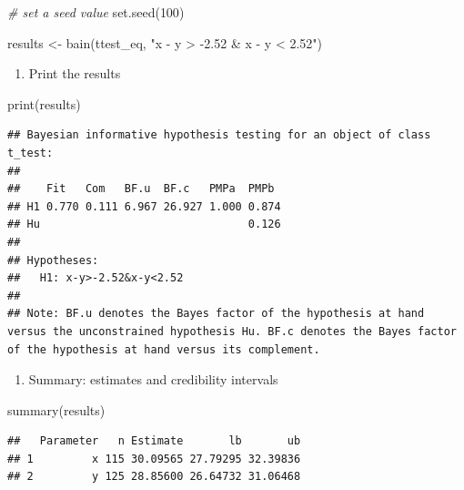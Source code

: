 \documentclass[
]{book}
\newenvironment{Shaded}{\begin{snugshade}}{\end{snugshade}}
\newcommand{\CommentTok}[1]{\textcolor[rgb]{0.56,0.35,0.01}{\textit{#1}}}
\newcommand{\DecValTok}[1]{\textcolor[rgb]{0.00,0.00,0.81}{#1}}
\newcommand{\FunctionTok}[1]{\textcolor[rgb]{0.00,0.00,0.00}{#1}}
\newcommand{\NormalTok}[1]{#1}
\newcommand{\OtherTok}[1]{\textcolor[rgb]{0.56,0.35,0.01}{#1}}
\newcommand{\StringTok}[1]{\textcolor[rgb]{0.31,0.60,0.02}{#1}}
\providecommand{\tightlist}{%
  \setlength{\itemsep}{0pt}\setlength{\parskip}{0pt}}
\begin{document}
\begin{Shaded}
\begin{Highlighting}[]
\CommentTok{\# set a seed value}
\FunctionTok{set.seed}\NormalTok{(}\DecValTok{100}\NormalTok{)}

\NormalTok{results }\OtherTok{\textless{}{-}} \FunctionTok{bain}\NormalTok{(ttest\_eq, }\StringTok{"x {-} y \textgreater{} {-}2.52 \& x {-} y \textless{} 2.52"}\NormalTok{)}
\end{Highlighting}
\end{Shaded}

\begin{enumerate}
\def\labelenumi{\arabic{enumi})}
\setcounter{enumi}{2}
\tightlist
\item
  Print the results
\end{enumerate}

\begin{Shaded}
\begin{Highlighting}[]
\FunctionTok{print}\NormalTok{(results)}
\end{Highlighting}
\end{Shaded}

\begin{verbatim}
## Bayesian informative hypothesis testing for an object of class t_test:
## 
##    Fit   Com   BF.u  BF.c   PMPa  PMPb 
## H1 0.770 0.111 6.967 26.927 1.000 0.874
## Hu                                0.126
## 
## Hypotheses:
##   H1: x-y>-2.52&x-y<2.52
## 
## Note: BF.u denotes the Bayes factor of the hypothesis at hand versus the unconstrained hypothesis Hu. BF.c denotes the Bayes factor of the hypothesis at hand versus its complement.
\end{verbatim}

\begin{enumerate}
\def\labelenumi{\arabic{enumi})}
\setcounter{enumi}{3}
\tightlist
\item
  Summary: estimates and credibility intervals
\end{enumerate}

\begin{Shaded}
\begin{Highlighting}[]
\FunctionTok{summary}\NormalTok{(results)}
\end{Highlighting}
\end{Shaded}

\begin{verbatim}
##   Parameter   n Estimate       lb       ub
## 1         x 115 30.09565 27.79295 32.39836
## 2         y 125 28.85600 26.64732 31.06468
\end{verbatim}
\end{document}
